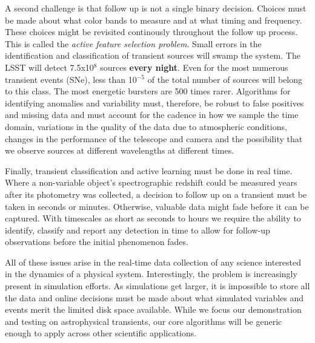 \documentclass[prd,nofootbib,floatfix,11pt,tightenlines]{revtex4}
\begin{document}
A second challenge is that follow up is not a single binary decision.
Choices must be made about what color bands to measure and at what timing
and frequency.  These choices might be revisited continously throughout the
follow up process.  This is called the {\em active feature selection
  problem}. Small errors in the identification and classification of transient
sources will swamp the system.  The LSST will detect 7.5x10$^8$ sources
{\bf every night}.  Even for the most numerous transient events (SNe), less
than 10$^{-5}$ of the total number of sources will belong to this class.
The most energetic bursters are 500 times rarer.  Algorithms for
identifying anomalies and variability must, therefore, be robust to false
positives and missing data and must account for the cadence in how we
sample the time domain, variations in the quality of the data due to
atmospheric conditions, changes in the performance of the telescope and
camera and the possibility that we observe sources at different wavelengths
at different times.

Finally, transient classification and active learning must be done in real
time.  Where a non-variable object's spectrographic redshift could be measured years
after its photometry was collected, a decision to follow up on a transient
must be taken in seconds or minutes. Otherwise, valuable data
might fade before it can be captured.  With timescales as short as seconds
to hours we require the ability to identify, classify and report any
detection in time to allow for follow-up observations before the initial
phenomenon fades.



All of these issues arise in the real-time data collection of any science
interested in the dynamics of a physical system.  Interestingly, the
problem is increasingly present in simulation efforts.  As simulations get
larger, it is impossible to store all the data and online decisions must be
made about what simulated variables and events merit the limited disk space
available.  While we focus our demonstration and testing on astrophysical
transients, our core algorithms will be generic enough to apply across
other scientific applications.
\end{document}
